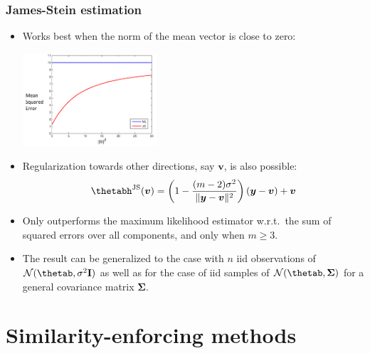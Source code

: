 \begin{frame}
	\frametitle{James-Stein estimation}
	
	\footnotesize
	\begin{itemize}
		
		\item Works best when the norm of the mean vector is close to zero:\\
		\begin{center}
			\includegraphics[width=5cm]{figure/JS}
		\end{center}  
		\item Regularization towards other directions, say $\bm{v}$, is also possible:
		$$
		\thetabh^{\mathrm{JS}}(\bm{v}) = \left (1 - \frac{(m-2)\sigma^2}{\|\yv - \bm{v}\|^2} \right )(\yv - \bm{v}) + \bm{v}
		$$
		\item Only outperforms the maximum likelihood estimator w.r.t.\ the sum of squared errors over all components, and only when $m \geq 3.$
		\item The result can be generalized to the case with $n$ iid observations of $\normal(\thetab, \sigma^2\mathbf{I})$ as well as for the case of iid samples of $\normal(\thetab, \bm{\Sigma})$ for a general covariance matrix $\bm{\Sigma}.$
	\end{itemize}
\end{frame}

\section{Similarity-enforcing methods}

